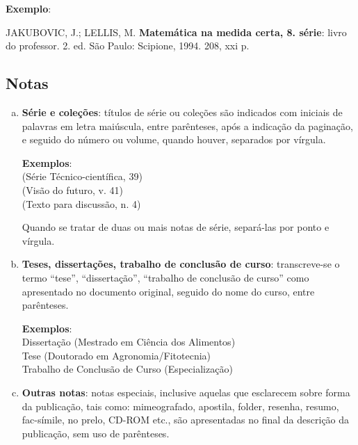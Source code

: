 \begin{exemplomanual}
\textbf{Exemplo}:\\
\begin{singlespace}
JAKUBOVIC, J.; LELLIS, M. \textbf{Matemática na medida certa, 8. série}:
livro do professor. 2. ed. São Paulo: Scipione, 1994. 208, xxi p.
\end{singlespace}
\end{exemplomanual}


\subsection{Notas}

\begin{enumerate}[a)]
  \item  \textbf{Série e coleções}: títulos de série ou coleções são indicados com iniciais de palavras em letra maiúscula, entre parênteses, após a indicação da paginação, e seguido do número ou volume, quando houver, separados por vírgula.

\begin{exemplomanuallista}
\textbf{Exemplos}:\\
(Série Técnico-científica, 39)\\
(Visão do futuro, v. 41)\\
(Texto para discussão, n. 4)
\end{exemplomanuallista}

Quando se tratar de duas ou mais notas de série, separá-las por ponto e vírgula.

  \item  \textbf{Teses, dissertações, trabalho de conclusão de curso}: transcreve-se o termo ``tese'', ``dissertação'', ``trabalho de conclusão de curso'' como apresentado no documento original, seguido do nome do curso, entre parênteses.
   
\begin{exemplomanuallista}
\textbf{Exemplos}:\\
Dissertação (Mestrado em Ciência dos Alimentos)\\
Tese (Doutorado em Agronomia/Fitotecnia)\\
Trabalho de Conclusão de Curso (Especialização)
\end{exemplomanuallista}

  \item  \textbf{Outras notas}: notas especiais, inclusive aquelas que esclarecem sobre forma da publicação, tais como: mimeografado, apostila, folder, resenha, resumo, fac-símile, no prelo, CD-ROM etc., são apresentadas no final da descrição da publicação, sem uso de parênteses.
\end{enumerate}


